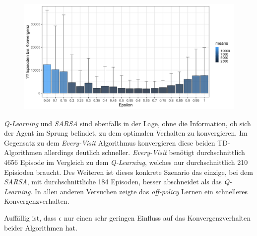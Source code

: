 \begin{figure}[H]
  \centering
  \includegraphics[width=\textwidth]{images/SimpleNoJumpEveryVisitMCA}
  \label{fig:test1}
\end{figure}
 
\textit{Q-Learning} und \textit{SARSA} sind ebenfalls in der Lage, ohne die Information, ob sich der Agent im Sprung befindet, zu dem optimalen Verhalten zu konvergieren. Im Gegensatz zu dem \textit{Every-Visit} Algorithmus konvergieren diese beiden TD-Algorithmen allerdings deutlich schneller. \textit{Every-Visit} benötigt durchschnittlich 4656 Episode im Vergleich zu dem \textit{Q-Learning}, welches nur durchschnittlich 210 Episioden braucht. Des Weiteren ist dieses konkrete Szenario das einzige, bei dem \textit{SARSA}, mit durchschnittliche 184 Episoden, besser abschneidet als das \textit{Q-Learning}. In allen anderen Versuchen zeigte das \textit{off-policy} Lernen ein schnelleres Konvergenzverhalten.
\par 
Auffällig ist, dass $\epsilon$ nur einen sehr geringen Einfluss auf das Konvergenzverhalten beider Algorithmen hat. 

